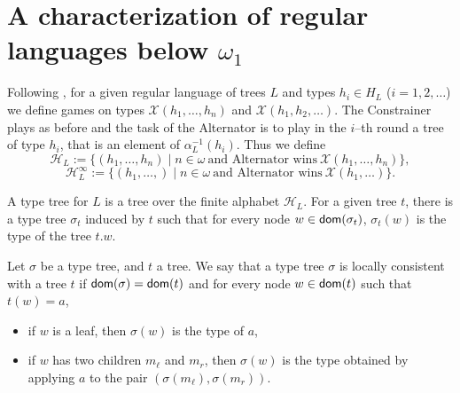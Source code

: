 \section{A characterization of regular languages  below $\omega_1$}

Following \cite{bp}, for a given regular language of trees $L$ and types $h_i\in H_L$ ($i=1,2,\dots$) we define games on types $\mathcal{X}(h_1, \dots, h_n)$ and $\mathcal{X}(h_1, h_2, \dots)$. The Constrainer plays as before and the task of the Alternator is to play in the $i$--th round a tree of type $h_i$, that is an element of $\alpha_L^{-1}(h_i)$. 
Thus we define
\[ \mathcal{H}_L:= \{(h_1, \dots, h_n) \mid n \in \omega\ \mbox{and Alternator wins}\ \mathcal{X}(h_1, \dots, h_n)\}, \]
\[ \mathcal{H}^\infty_L:= \{(h_1, \dots,) \mid n \in \omega\ \mbox{and Alternator wins}\ \mathcal{X}(h_1, \dots )\}.\]


A type tree for $L$ is a tree over the finite alphabet $\mathcal{H}_L$. For a given tree $t$, there is a type tree $\sigma_t$ induced by $t$ such that for every node $w \in \mathsf{dom}(\sigma_t)$, $\sigma_t(w)$ is the type of the tree $t.w$.

Let $\sigma$ be a type tree, and $t$ a tree. We say that a type tree $\sigma$ is locally consistent with a tree $t$ if $\mathsf{dom}(\sigma)=\mathsf{dom}(t)$ and for every node $w \in \mathsf{dom}(t)$ such that $t(w)=a$, 
\begin{itemize}
\item if $w$ is a leaf, then $\sigma(w)$ is the type of $a$,
\item if $w$ has two children $m_\ell$ and $m_r$, then $\sigma(w)$ is the type obtained by applying $a$ to the pair $(\sigma(m_\ell), \sigma(m_r))$.
\end{itemize}

